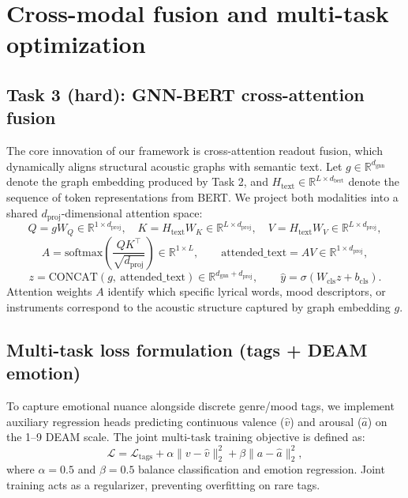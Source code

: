 \documentclass[10pt]{article}
\begin{document}
\section{Cross-modal fusion and multi-task optimization}

\subsection{Task 3 (hard): GNN-BERT cross-attention fusion}

The core innovation of our framework is cross-attention readout fusion, which dynamically aligns structural acoustic graphs with semantic text. Let $g \in \mathbb{R}^{d_{\text{gnn}}}$ denote the graph embedding produced by Task 2, and $H_{\text{text}} \in \mathbb{R}^{L \times d_{\text{bert}}}$ denote the sequence of token representations from BERT. We project both modalities into a shared $d_{\text{proj}}$-dimensional attention space:
\begin{equation}
  Q = g W_Q \in \mathbb{R}^{1 \times d_{\text{proj}}}, \quad K = H_{\text{text}} W_K \in \mathbb{R}^{L \times d_{\text{proj}}}, \quad V = H_{\text{text}} W_V \in \mathbb{R}^{L \times d_{\text{proj}}},
\end{equation}
\begin{equation}
  A = \text{softmax}\!\left(\frac{Q K^{\top}}{\sqrt{d_{\text{proj}}}}\right) \in \mathbb{R}^{1 \times L}, \qquad \text{attended\_text} = A V \in \mathbb{R}^{1 \times d_{\text{proj}}},
\end{equation}
\begin{equation}
  z = \text{CONCAT}(g,\ \text{attended\_text}) \in \mathbb{R}^{d_{\text{gnn}} + d_{\text{proj}}}, \qquad \hat{y} = \sigma(W_{\text{cls}} z + b_{\text{cls}}).
\end{equation}
Attention weights $A$ identify which specific lyrical words, mood descriptors, or instruments correspond to the acoustic structure captured by graph embedding $g$.

\subsection{Multi-task loss formulation (tags + DEAM emotion)}

To capture emotional nuance alongside discrete genre/mood tags, we implement auxiliary regression heads predicting continuous valence ($\hat v$) and arousal ($\hat a$) on the 1--9 DEAM scale. The joint multi-task training objective is defined as:
\begin{equation}
  \mathcal{L} = \mathcal{L}_{\text{tags}} + \alpha \lVert v - \hat v \rVert_2^2 + \beta \lVert a - \hat a \rVert_2^2,
\end{equation}
where $\alpha = 0.5$ and $\beta = 0.5$ balance classification and emotion regression. Joint training acts as a regularizer, preventing overfitting on rare tags.
\end{document}

